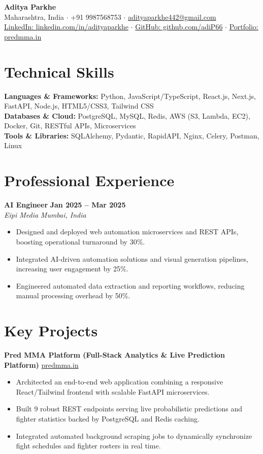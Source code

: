 \documentclass[10pt,a4paper]{article}
\begin{document}
\begin{center}
    {\LARGE \textbf{Aditya Parkhe}} \\[3pt]
    \small Maharashtra, India \; $\cdot$ \; +91 9987568753 \; $\cdot$ \; \href{mailto:adityaparkhe442@gmail.com}{adityaparkhe442@gmail.com} \\[2pt]
    \href{https://linkedin.com/in/adityaparkhe}{LinkedIn: linkedin.com/in/adityaparkhe} \; $\cdot$ \; \href{https://github.com/adiP66}{GitHub: github.com/adiP66} \; $\cdot$ \; \href{https://predmma.in}{Portfolio: predmma.in}
\end{center}

\section*{Technical Skills}
\textbf{Languages \& Frameworks:} Python, JavaScript/TypeScript, React.js, Next.js, FastAPI, Node.js, HTML5/CSS3, Tailwind CSS \\
\textbf{Databases \& Cloud:} PostgreSQL, MySQL, Redis, AWS (S3, Lambda, EC2), Docker, Git, RESTful APIs, Microservices \\
\textbf{Tools \& Libraries:} SQLAlchemy, Pydantic, RapidAPI, Nginx, Celery, Postman, Linux

\section*{Professional Experience}
\textbf{AI Engineer} \hfill \textbf{Jan 2025 -- Mar 2025} \\
\textit{Eipi Media} \hfill \textit{Mumbai, India}
\begin{itemize}
    \item Designed and deployed web automation microservices and REST APIs, boosting operational turnaround by 30\%.
    \item Integrated AI-driven automation solutions and visual generation pipelines, increasing user engagement by 25\%.
    \item Engineered automated data extraction and reporting workflows, reducing manual processing overhead by 50\%.
\end{itemize}

\section*{Key Projects}
\textbf{Pred MMA Platform (Full-Stack Analytics \& Live Prediction Platform)} \hfill \href{https://predmma.in}{predmma.in}
\begin{itemize}
    \item Architected an end-to-end web application combining a responsive React/Tailwind frontend with scalable FastAPI microservices.
    \item Built 9 robust REST endpoints serving live probabilistic predictions and fighter statistics backed by PostgreSQL and Redis caching.
    \item Integrated automated background scraping jobs to dynamically synchronize fight schedules and fighter rosters in real time.
\end{itemize}
\end{document}

